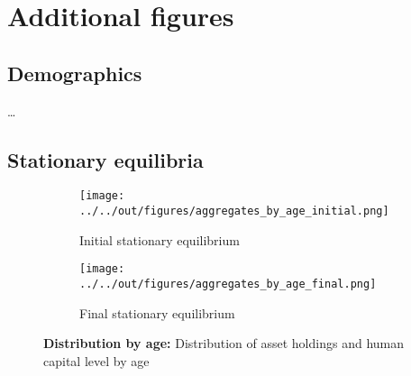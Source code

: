 \section{Additional figures}
\label{sec:figures}

\subsection{Demographics}

\dots



\subsection{Stationary equilibria}

\begin{figure}[ht]
    \centering
    \begin{subfigure}[b]{0.45\textwidth}
        \centering
        \texttt{[image: ../../out/figures/aggregates\_by\_age\_initial.png]}
        \caption{Initial stationary equilibrium}
        \label{fig:aggregates_by_age_initial}
    \end{subfigure}
    \hfill
    \begin{subfigure}[b]{0.45\textwidth}
        \centering
        \texttt{[image: ../../out/figures/aggregates\_by\_age\_final.png]}
        \caption{Final stationary equilibrium}
        \label{fig:aggregates_by_age_final}
    \end{subfigure}
    \caption{\textbf{Distribution by age:} Distribution of asset holdings and human capital level by age}
    \label{fig:aggregates_by_age}
\end{figure}
